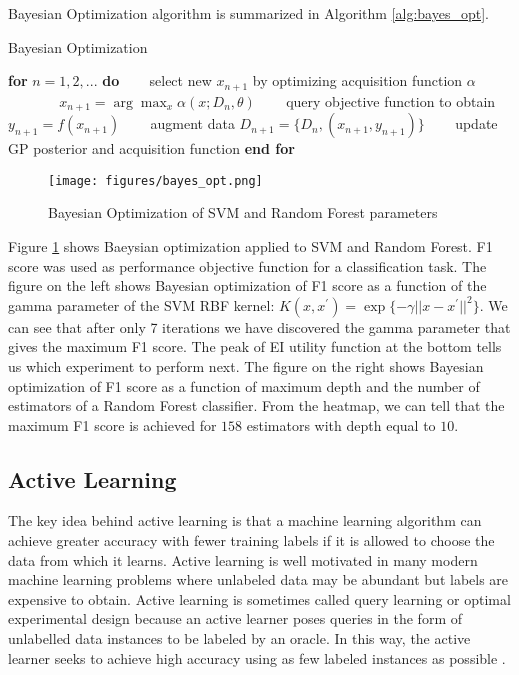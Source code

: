 Bayesian Optimization algorithm is summarized in Algorithm \ref{alg:bayes_opt}.
\begin{algorithm}
\caption{Bayesian Optimization}
\label{alg:bayes_opt}
\begin{algorithmic}[1]
\STATE \textbf{for} $n=1,2,...$ \textbf{do}
\STATE ~~~ select new $x_{n+1}$ by optimizing acquisition function $\alpha$\\
~~~ ~~~ $x_{n+1} = \arg \max_x \alpha(x;D_n,\theta)$
\STATE ~~~ query objective function to obtain $y_{n+1} = f(x_{n+1})$
\STATE ~~~ augment data $D_{n+1} = \{D_n,(x_{n+1},y_{n+1})\}$
\STATE ~~~ update GP posterior and acquisition function 
\STATE \textbf{end for}  
\end{algorithmic}
\end{algorithm}


\begin{figure}[tbhp]
    \centering
    \texttt{[image: figures/bayes\_opt.png]}
    \caption{Bayesian Optimization of SVM and Random Forest parameters}
    \label{fig:bayes_opt}
\end{figure}

Figure \ref{fig:bayes_opt} shows Baeysian optimization applied to SVM and Random Forest. F1 score was used as performance objective function for a classification task. The figure on the left shows Bayesian optimization of F1 score as a function of the gamma parameter of the SVM RBF kernel: $K(x,x^{\prime}) = \exp\{-\gamma ||x-x^{\prime}||^{2}\}$. We can see that after only 7 iterations we have discovered the gamma parameter that gives the maximum F1 score. The peak of EI utility function at the bottom tells us which experiment to perform next. The figure on the right shows Bayesian optimization of F1 score as a function of maximum depth and the number of estimators of a Random Forest classifier. From the heatmap, we can tell that the maximum F1 score is achieved for $158$ estimators with depth equal to $10$.    


\subsection{Active Learning}

The key idea behind active learning is that a machine learning algorithm can achieve greater accuracy with fewer training labels if it is allowed to choose the data from which it learns. Active learning is well motivated in many modern machine learning problems where unlabeled data may be abundant but labels are expensive to obtain. Active learning is sometimes called query learning or optimal experimental design because an active learner poses queries in the form of unlabelled data instances to be labeled by an oracle. In this way, the active learner seeks to achieve high accuracy using as few labeled instances as possible \cite{Settles2009}.\\

